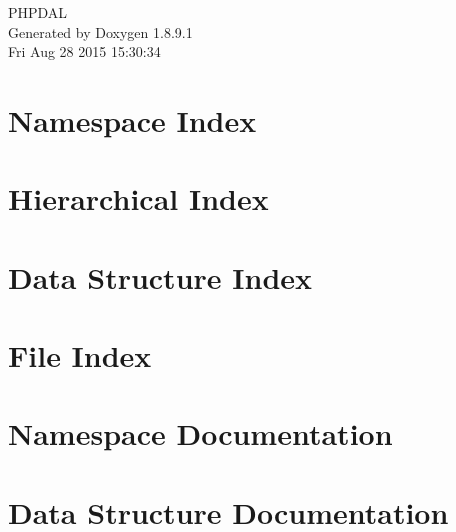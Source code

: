 \documentclass[twoside]{book}
\newcommand{\+}{\discretionary{\mbox{\scriptsize$\hookleftarrow$}}{}{}}
\newcommand{\clearemptydoublepage}{%
  \newpage{\pagestyle{empty}\cleardoublepage}%
}
\begin{document}
\hypersetup{pageanchor=false,
             bookmarks=true,
             bookmarksnumbered=true,
             pdfencoding=unicode
            }
\begin{titlepage}
\vspace*{7cm}
\begin{center}%
{\Large P\+H\+P\+D\+A\+L }\\
\vspace*{1cm}
{\large Generated by Doxygen 1.8.9.1}\\
\vspace*{0.5cm}
{\small Fri Aug 28 2015 15:30:34}\\
\end{center}
\end{titlepage}
\clearemptydoublepage
\tableofcontents
\clearemptydoublepage
{}
\hypersetup{pageanchor=true}

\chapter{Namespace Index}

\chapter{Hierarchical Index}

\chapter{Data Structure Index}

\chapter{File Index}

\chapter{Namespace Documentation}

\chapter{Data Structure Documentation}

















\end{document}
